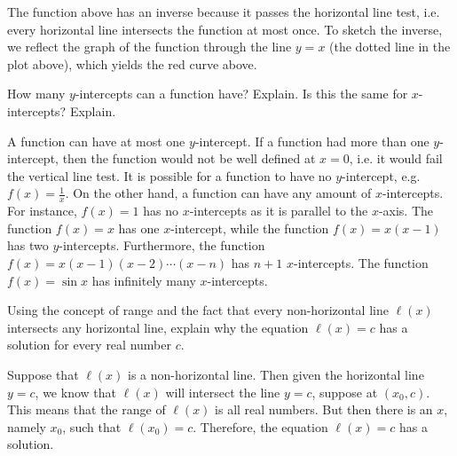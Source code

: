 \documentclass[11pt,letterpaper]{article}
\begin{document}
\sol The function above has an inverse because it passes the horizontal line test, i.e. every horizontal line intersects the function at most once. To sketch the inverse, we reflect the graph of the function through the line $y= x$ (the dotted line in the plot above), which yields the red curve above.  



\newpage



 How many $y$-intercepts can a function have? Explain. Is this the same for $x$-intercepts? Explain. \pspace

\sol A function can have at most one $y$-intercept. If a function had more than one $y$-intercept, then the function would not be well defined at $x= 0$, i.e. it would fail the vertical line test. It is possible for a function to have no $y$-intercept, e.g. $f(x)= \frac{1}{x}$. On the other hand, a function can have any amount of $x$-intercepts. For instance, $f(x)= 1$ has no $x$-intercepts as it is parallel to the $x$-axis. The function $f(x)= x$ has one $x$-intercept, while the function $f(x)= x(x - 1)$ has two $y$-intercepts. Furthermore, the function $f(x)= x(x - 1)(x - 2) \cdots (x - n)$ has $n + 1$ $x$-intercepts. The function $f(x)= \sin x$ has infinitely many $x$-intercepts. 



\newpage



 Using the concept of range and the fact that every non-horizontal line $\ell(x)$ intersects any horizontal line, explain why the equation $\ell(x)= c$ has a solution for every real number $c$. \pspace

\sol Suppose that $\ell(x)$ is a non-horizontal line. Then given the horizontal line $y= c$, we know that $\ell(x)$ will intersect the line $y= c$, suppose at $(x_0, c)$. This means that the range of $\ell(x)$ is all real numbers. But then there is an $x$, namely $x_0$, such that $\ell(x_0)= c$. Therefore, the equation $\ell(x)= c$ has a solution. 
\end{document}
